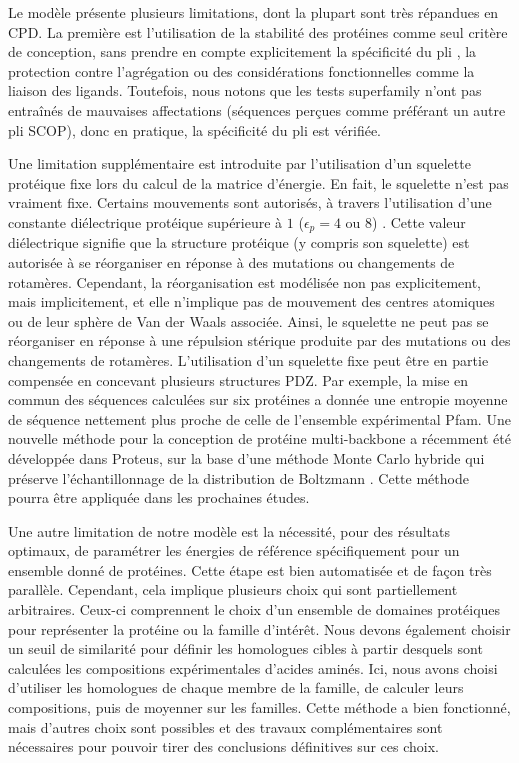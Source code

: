 Le modèle présente plusieurs limitations, dont la plupart sont très répandues en CPD. La première est l'utilisation de la stabilité des protéines comme seul critère de conception, sans prendre en compte explicitement la spécificité du pli \cite{Schmidt08, Simonson13}, la protection contre l'agrégation ou des considérations fonctionnelles comme la liaison des ligands. Toutefois, nous notons que les tests superfamily n'ont pas entraînés de mauvaises affectations (séquences perçues comme préférant un autre pli SCOP), donc en pratique, la spécificité du pli est vérifiée.

Une limitation supplémentaire est introduite par l'utilisation d'un squelette protéique fixe lors du calcul de la matrice d'énergie. En fait, le squelette n'est pas vraiment fixe. Certains mouvements sont autorisés, à travers l'utilisation d'une constante diélectrique protéique supérieure à $1$ ($\epsilon_p= 4$ ou $8$) \cite{Simonson13}. Cette valeur diélectrique signifie que la structure protéique (y compris son squelette) est autorisée à se réorganiser en réponse à des mutations ou changements de rotamères. Cependant, la réorganisation est modélisée non pas explicitement, mais implicitement, et elle n'implique pas de mouvement des centres atomiques ou de leur sphère de Van der Waals associée. Ainsi, le squelette ne peut pas se réorganiser en réponse à une répulsion stérique produite par des mutations ou des changements de rotamères. L'utilisation d'un squelette fixe peut être en partie compensée en concevant plusieurs structures PDZ. Par exemple, la mise en commun des séquences calculées sur six protéines a donnée une entropie moyenne de séquence nettement plus proche de celle de l'ensemble expérimental  Pfam. Une nouvelle méthode pour la conception de protéine multi-backbone a récemment été développée dans Proteus, sur la base d'une méthode Monte Carlo hybride qui préserve l'échantillonnage de la distribution de Boltzmann \cite{Druart17}. Cette méthode pourra être appliquée dans les prochaines études.

Une autre limitation de notre modèle est la nécessité, pour des résultats optimaux, de paramétrer les énergies de référence spécifiquement pour un ensemble donné de protéines. Cette étape est bien automatisée et de façon très parallèle. Cependant, cela implique plusieurs choix qui sont partiellement arbitraires. Ceux-ci comprennent le choix d'un ensemble de domaines protéiques pour représenter la protéine ou la famille d'intérêt. Nous devons également choisir un seuil de similarité pour définir les homologues cibles à partir desquels sont calculées les compositions expérimentales d'acides aminés. Ici, nous avons choisi d'utiliser les homologues de chaque membre de la famille, de calculer leurs compositions, puis de moyenner sur les familles. Cette méthode a bien fonctionné, mais d'autres choix sont possibles et des travaux complémentaires sont nécessaires pour pouvoir tirer des conclusions définitives sur ces choix.


